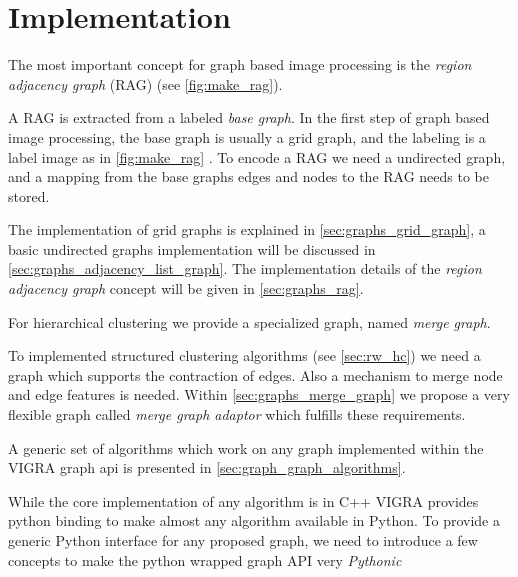 

\section{Implementation}\label{sec:vigra_graph_lib_impl}


The most important concept for graph based image processing
is the \emph{region adjacency graph} (RAG) (see \cref{fig:make_rag}).

A RAG is extracted from a labeled \emph{base graph}.
In the first step of graph based image processing, the base 
graph is usually a grid graph, and the labeling is a label image
as in \cref{fig:make_rag} .
To encode a RAG we need a undirected graph, 
and a mapping from the base graphs edges and nodes to the RAG 
needs to be stored.

The implementation of grid graphs is explained in \cref{sec:graphs_grid_graph}, 
a basic undirected graphs implementation will be discussed in \cref{sec:graphs_adjacency_list_graph}.
The implementation details of the \emph{region adjacency graph} concept will 
be given in  \cref{sec:graphs_rag}.

For hierarchical clustering we provide a specialized graph, named \emph{merge graph}.


To implemented structured clustering algorithms (see \cref{sec:rw_hc}) we
need a graph which supports the contraction of edges.
Also a mechanism to merge node and edge features is needed.
Within \cref{sec:graphs_merge_graph} we propose  a very flexible graph 
called \emph{merge graph adaptor} which fulfills these requirements.


A generic set of algorithms which work on any graph
implemented within the VIGRA graph api is presented 
in \cref{sec:graph_graph_algorithms}.

While the core implementation of any algorithm is in C++
VIGRA provides python binding to make almost
any algorithm available in Python.
To provide a generic Python interface for any proposed
graph, we need to introduce a few concepts 
to make the python wrapped graph API very \emph{Pythonic}


